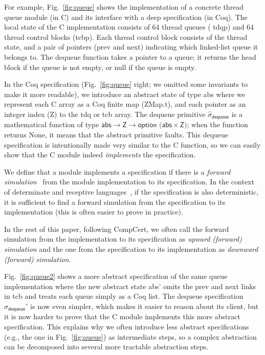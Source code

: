For example, Fig.~\ref{fig:queue} shows the implementation of a
concrete thread queue module (in C) and its interface with a deep
specification (in Coq). The local state of the C implementation
consists of 64 thread queues (%
\textsf{tdqp}) and 64 thread control blocks
(\textsf{tcbp}).  Each thread control block consists of the thread state,
and a pair of pointers (\textsf{prev} and \textsf{next}) indicating which
linked-list queue it belongs to. The \textsf{dequeue} function 
takes a pointer to a queue; it returns the head block if the queue
is not empty, or null if the queue is empty.

In the Coq specification (Fig.~\ref{fig:queue} right; we omitted some
invariants to make it more readable), we introduce an abstract state
of type \textsf{abs} where we represent each C array as a Coq finite map
(\textsf{ZMap.t}), and each pointer as an integer index (\textsf{Z}) to the
\textsf{tdq} or \textsf{tcb} array. The \textsf{dequeue} primitive 
$\hat{\sigma}_\textsf{dequeue}$ is
a mathematical function of type $\textsf{abs} \rightarrow \textsf{Z}
\rightarrow \textsf{option (abs}\times \textsf{Z)}$; when the function returns
\textsf{None}, it means that the abstract primitive faults.  This
\textsf{dequeue} specification is intentionally made very similar to the C
function, so we can easily show that the C module indeed {\em
  implements} the specification. 

We define that a module implements a specification if there is a
{\em forward simulation}~\cite{Lynch95} from the module implementation to its
specification. In the context of determinate and receptive 
languages~\cite{sevcik13,Leroy-backend},
if the specification is also deterministic, it is sufficient to find
a forward simulation from the specification to its
implementation (this is often easier to prove in practice). 

In the rest of this paper, following CompCert, we often call the
forward simulation from the implementation to its specification
as {\em upward (forward) simulation} and the one from the specification
to its implementation as {\em downward (forward) simulation}.

Fig.~\ref{fig:queue2} shows a more abstract specification of the same
queue implementation where the new abstract state \textsf{abs'} omits
the \textsf{prev} and \textsf{next} links in \textsf{tcb} and treats each
queue simply as a Coq list. The \textsf{dequeue} specification 
$\hat{\sigma}_\textsf{dequeue}'$ is now
even simpler, which makes it easier to reason about its client,
but it is now harder to prove that the C module
implements this more abstract specification.  This explains why we
often introduce less abstract specifications (e.g.,
the one in Fig.~\ref{fig:queue}) as intermediate steps, so a
complex abstraction can be decomposed into several more tractable
abstraction steps.

